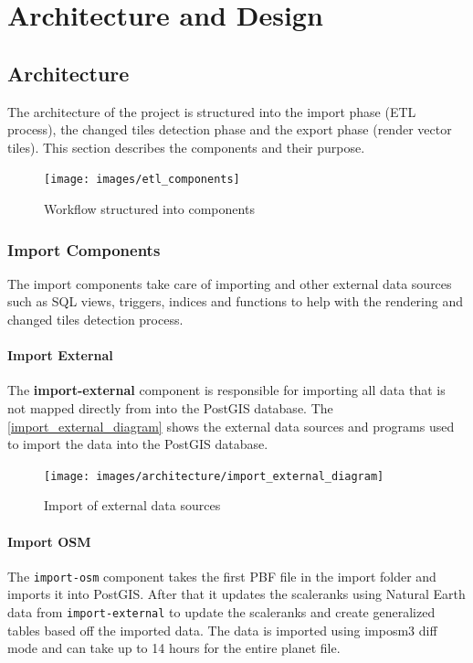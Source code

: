 \chapter{Architecture and Design}\label{design}

\section{Architecture}

The architecture of the project is structured into the import phase (ETL process), the changed tiles detection phase  and the export phase (render vector tiles). This section describes the components and their purpose.

\begin{figure}[H]
  \centering
  \texttt{[image: images/etl\_components]}
  \caption{Workflow structured into components}
\end{figure}

\subsection{Import Components}

The import components take care of importing \osm{} and other external data sources such as SQL views, triggers, indices and functions to help with the rendering and changed tiles detection process.

\subsubsection{Import External}

The \textbf{import-external} component is responsible for importing all data that is not mapped directly from \osm{} into the PostGIS database.
The \autoref{import_external_diagram} shows the external data sources and programs used to import the data into the PostGIS database.

\begin{figure}[H]
  \centering
  \texttt{[image: images/architecture/import\_external\_diagram]}
  \caption{Import of external data sources}
  \label{import_external_diagram} 
\end{figure}

\subsubsection{Import OSM}

The \texttt{import-osm} component takes the first PBF file in the import folder and imports it into PostGIS. After that it updates the scaleranks using Natural Earth data from \texttt{import-external} to update the scaleranks and create generalized tables based off the imported data. The data is imported using imposm3 diff mode and can take up to 14 hours for the entire planet file.

